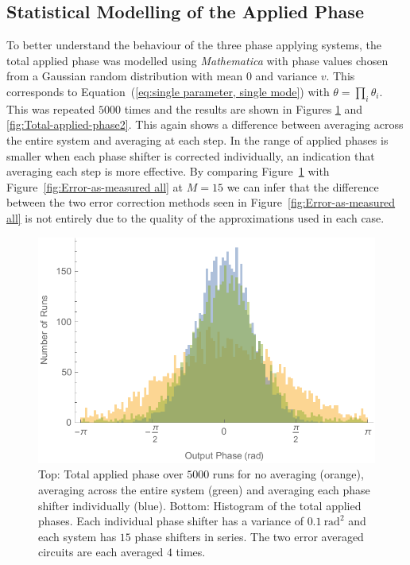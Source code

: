 \documentclass[aps,pra,twocolumn,superscriptaddress,numerical,floatfix]{revtex4-1}
\begin{document}


\subsection{Statistical Modelling of the Applied Phase\label{Statistical Modelling of the Applied Phase}}

To better understand the behaviour of the three phase applying systems, the total applied phase was modelled using \textit{Mathematica} with phase values chosen from a Gaussian random distribution with mean $0$ and variance $v$. This corresponds to Equation~(\ref{eq:single parameter, single mode}) with $\theta=\prod_{i}\theta_{i}$. This was repeated $5000$ times and the results are shown in Figures \ref{fig:Total-applied-phase1} and \ref{fig:Total-applied-phase2}. This again shows a difference between averaging across the entire system and averaging at each step. In the range of applied phases is smaller when each phase shifter is corrected individually, an indication that averaging each step is more effective. By comparing Figure~\ref{fig:Total-applied-phase1} with Figure~\ref{fig:Error-as-measured all} at $M=15$ we can infer that the difference between the two error correction methods seen in Figure~\ref{fig:Error-as-measured all} is not entirely due to the quality of the approximations used in each case.
%
\begin{figure}
\centerline{\includegraphics[width=\columnwidth]{totphase1.pdf}}
\caption{Top: Total applied phase over $5000$ runs for no averaging (orange), averaging across the entire system (green) and averaging each phase shifter individually (blue). Bottom: Histogram of the total applied phases. Each individual phase shifter has a variance of $0.1\ \textrm{rad}^{2}$ and each system has $15$ phase shifters in series. The two error averaged circuits are each averaged $4$ times. \label{fig:Total-applied-phase1}}
\end{figure}
\end{document}
